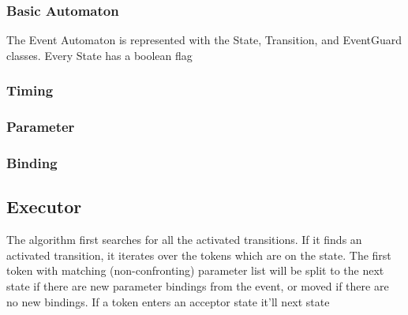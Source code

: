 			\subsubsection{Basic Automaton}
				The Event Automaton is represented with the State, Transition, and EventGuard classes.
				Every State has a boolean flag 
			\subsubsection{Timing}
			
			\subsubsection{Parameter}
			
			\subsubsection{Binding}
		
		\subsection{Executor}
			The algorithm first searches for all the activated transitions.
			If it finds an activated transition, it iterates over the tokens which are on the state. The first token with matching (non-confronting)
			parameter list will be split to the next state if there are new parameter bindings from the event, or moved if there are no new bindings.
			If a token enters an acceptor state it'll 
			next state 
